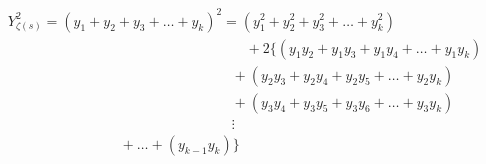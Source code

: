 \documentclass{amsart}
\begin{document}
	\[ \begin{array}{c}
		Y_{\zeta(s)}^2 = (y_1 + y_2 + y_3 + \dots + y_k)^2 = (y_1^2 + y_2^2 + y_3^2 + \dots + y_k^2) \\
		\qquad\qquad\qquad\qquad\qquad\qquad\qquad\qquad\quad + 2\{(y_1y_2 + y_1y_3 + y_1y_4 + \dots + y_{1}y_{k}) \\ 
		\qquad\qquad\qquad\qquad\qquad\qquad\qquad\qquad + (y_2y_3 + y_2y_4 + y_2y_5 + \dots + y_2y_{k}) \\ 
		\qquad\qquad\qquad\qquad\qquad\qquad\qquad\qquad + (y_3y_4 + y_3y_5 + y_3y_6 + \dots + y_3y_{k}) \\ 
		\qquad\qquad\qquad\qquad\qquad\qquad\qquad\qquad \vdots \\
		\qquad\qquad\qquad\qquad + \dots + (y_{k-1}y_{k}) \} \\ 
	\end{array} \]
	\[\]
	
\end{document}

